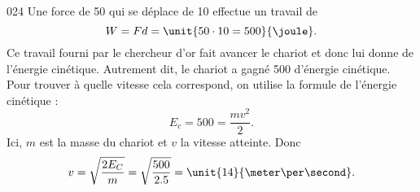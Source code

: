 

\begin{corrige}{024}
Une force de \unit{50}{\newton} qui se déplace de \unit{10}{\meter} effectue un travail de 
\[
 W=Fd=\unit{50\cdot 10=500}{\joule}.
\]
 Ce travail fourni par le chercheur d'or  fait avancer le chariot et donc lui donne de l'énergie cinétique. Autrement dit, le chariot a gagné \unit{500}{\joule} d'énergie cinétique. Pour trouver à quelle vitesse cela correspond, on utilise la formule de l'énergie cinétique :
\[ 
  E_c=500=\frac{ mv^2 }{ 2 }.
\]
Ici, $m$ est la masse du chariot et $v$ la vitesse atteinte. Donc
\[ 
  v=\sqrt{ \frac{ 2E_C }{ m } }=\sqrt{ \frac{ 500 }{ 2.5 } }=\unit{14}{\meter\per\second}.
\]
\end{corrige}

